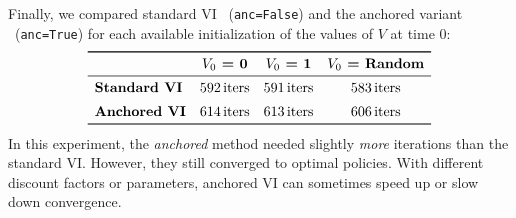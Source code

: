 \noindent
Finally, we compared standard VI \ (\texttt{anc=False}) and the anchored variant 
\ (\texttt{anc=True}) for each available initialization of the values of $V$ at time $0$:
\[
  \begin{array}{lccc}
  \toprule
    & \textbf{$V_0$ = 0} & \textbf{$V_0$ = 1} & \textbf{$V_0$ = Random} \\
  \midrule
  \textbf{Standard VI} & 592\,\text{iters} & 591\,\text{iters} & 583\,\text{iters}\\[5pt]
  \textbf{Anchored VI} & 614\,\text{iters} & 613\,\text{iters} & 606\,\text{iters}\\
  \bottomrule
  \end{array}
\]
In this experiment, the \emph{anchored} method needed slightly \emph{more} iterations 
than the standard VI.  However, they still converged to optimal policies. 
With different discount factors or parameters, anchored VI can sometimes speed up or slow down convergence.